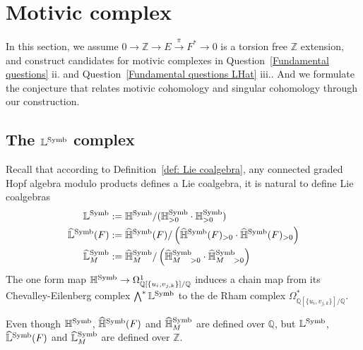 \section{Motivic complex}

In this section, we  assume $0\to\mathbb Z\to E\xrightarrow{\pi} F^*\to0$ is a torsion free $\mathbb Z$ extension, and construct candidates for motivic complexes in Question~\ref{Fundamental questions} ii. and Question~\ref{Fundamental questions LHat} iii.. And we formulate the conjecture that relates motivic cohomology and singular cohomology through our construction.

\subsection{The $\mathbb L^{\operatorname{Symb}}$ complex}

Recall that according to Definition~\ref{def: Lie coalgebra}, any connected graded Hopf algebra modulo products defines a Lie coalgebra, it is natural to define Lie coalgebras
\begin{equation}
\begin{aligned}
\mathbb L^{\operatorname{Symb}}&:=\mathbb H^{\operatorname{Symb}} / (\mathbb H^{\operatorname{Symb}}_{>0}\cdot \mathbb H^{\operatorname{Symb}}_{>0})\\
\widehat{\mathbb L}^{\operatorname{Symb}}(F)&:=\widehat{\mathbb H}^{\operatorname{Symb}}(F) /\left (\widehat{\mathbb H}^{\operatorname{Symb}}(F)_{>0}\cdot \widehat{\mathbb H}^{\operatorname{Symb}}(F)_{>0}\right)\\
\widehat{\mathbb L}^{\operatorname{Symb}}_M&:=\widehat{\mathbb H}^{\operatorname{Symb}}_M/\left(\widehat{\mathbb H}^{\operatorname{Symb}}_{M\quad>0}\cdot\widehat{\mathbb H}^{\operatorname{Symb}}_{M\quad>0}\right)
\end{aligned}
\end{equation}
The one form map $\mathbb H^{\operatorname{Symb}}\to\Omega^1_{\mathbb Q[\{u_i,v_{j,k}\}]/\mathbb Q}$ induces a chain map from its Chevalley-Eilenberg complex $\bigwedge^*\mathbb L^{\operatorname{Symb}}$ to the de Rham complex $\Omega^*_{\mathbb Q[\{u_i,v_{j,k}\}]/\mathbb Q}$.

\begin{remark}
Even though $\mathbb H^{\operatorname{Symb}}$, $\widehat{\mathbb H}^{\operatorname{Symb}}(F)$ and $\widehat{\mathbb H}^{\operatorname{Symb}}_M$ are defined over $\mathbb Q$, but $\mathbb L^{\operatorname{Symb}}$, $\widehat{\mathbb L}^{\operatorname{Symb}}(F)$ and $\widehat{\mathbb L}^{\operatorname{Symb}}_M$ are defined over $\mathbb Z$.
\end{remark}

